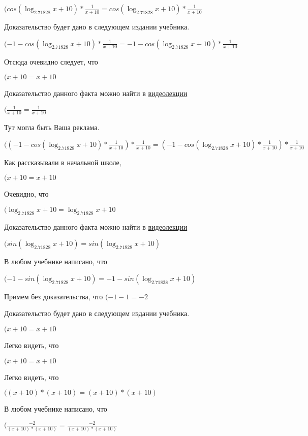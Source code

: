 \documentclass[12pt,a4paper,fleqn]{article}
\theoremstyle{definition}
\begin{document}
$(cos(\log_{ 2.71828 }{ x  +  10 }) * \frac{ 1 }{ x  +  10 }
 = cos(\log_{ 2.71828 }{ x  +  10 }) * \frac{ 1 }{ x  +  10 }
$

Доказательство будет дано в следующем издании учебника.

$( -1  - cos(\log_{ 2.71828 }{ x  +  10 }) * \frac{ 1 }{ x  +  10 }
 =  -1  - cos(\log_{ 2.71828 }{ x  +  10 }) * \frac{ 1 }{ x  +  10 }
$

Отсюда очевидно следует, что

$( x  +  10  =  x  +  10 $

Доказательство данного факта можно найти в \href{https://www.youtube.com/watch?v=dQw4w9WgXcQ}{видеолекции}

$(\frac{ 1 }{ x  +  10 }
 = \frac{ 1 }{ x  +  10 }
$

Тут могла быть Ваша реклама.

$(( -1  - cos(\log_{ 2.71828 }{ x  +  10 }) * \frac{ 1 }{ x  +  10 }
) * \frac{ 1 }{ x  +  10 }
 = ( -1  - cos(\log_{ 2.71828 }{ x  +  10 }) * \frac{ 1 }{ x  +  10 }
) * \frac{ 1 }{ x  +  10 }
$

Как рассказывали в начальной школе,

$( x  +  10  =  x  +  10 $

Очевидно, что

$(\log_{ 2.71828 }{ x  +  10 } = \log_{ 2.71828 }{ x  +  10 }$

Доказательство данного факта можно найти в \href{https://www.youtube.com/watch?v=dQw4w9WgXcQ}{видеолекции}

$(sin(\log_{ 2.71828 }{ x  +  10 }) = sin(\log_{ 2.71828 }{ x  +  10 })$

В любом учебнике написано, что

$( -1  - sin(\log_{ 2.71828 }{ x  +  10 }) =  -1  - sin(\log_{ 2.71828 }{ x  +  10 })$

Примем без доказательства, что
$( -1  -  1  =  -2 $

Доказательство будет дано в следующем издании учебника.

$( x  +  10  =  x  +  10 $

Легко видеть, что

$( x  +  10  =  x  +  10 $

Легко видеть, что

$(( x  +  10 ) * ( x  +  10 ) = ( x  +  10 ) * ( x  +  10 )$

В любом учебнике написано, что

$(\frac{ -2 }{( x  +  10 ) * ( x  +  10 )}
 = \frac{ -2 }{( x  +  10 ) * ( x  +  10 )}
$
\end{document}
